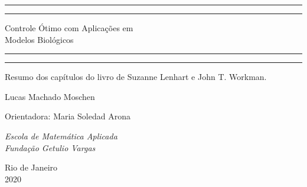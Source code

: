 \begin{titlepage} 
    
	\centering 
	
	
	\rule{\textwidth}{2pt}\vspace*{-\baselineskip}\vspace*{2pt} 
	\rule{\textwidth}{1pt} 
	
	\vspace{0.75\baselineskip}
	
	{\LARGE Controle Ótimo com Aplicações em \vspace{4mm} \\ Modelos Biológicos}
	
	\vspace{0.75\baselineskip} 
	
    \rule{\textwidth}{1pt}\vspace*{-\baselineskip}\vspace{3pt} 
	\rule{\textwidth}{2pt} 
	
	\vspace{2\baselineskip} 
	
	
    Resumo dos capítulos do livro de Suzanne Lenhart e John T. Workman.
	
	\vspace*{4\baselineskip}
    
	
	{\Large Lucas Machado Moschen\\} 
	
	\vspace{2\baselineskip}

	{\large Orientadora: Maria Soledad Arona\\} 

	\vspace{2\baselineskip}
	
    \textit{Escola de Matemática Aplicada\\} 
    \vspace{0.5\baselineskip}
    \textit{Fundação Getulio Vargas}
	
    \vfill
	
    \large Rio de Janeiro \\
    \vspace{0.5\baselineskip}
    \large 2020
    
\end{titlepage}
